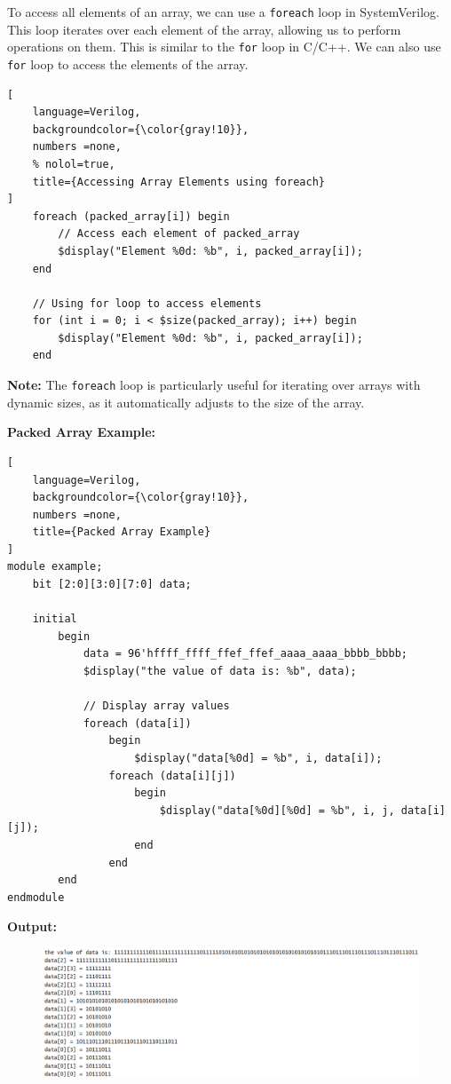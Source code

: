 \documentclass[12pt, a4paper]{article}
\begin{document}
To access all elements of an array, we can use a \texttt{foreach} loop in SystemVerilog. This loop iterates over each element of the array, allowing us to perform operations on them. This is similar to the \texttt{for} loop in C/C++. We can also use \texttt{for} loop to access the elements of the array.
\begin{lstlisting}[
    language=Verilog,
    backgroundcolor={\color{gray!10}},
    numbers =none,
    % nolol=true,
    title={Accessing Array Elements using foreach}
]
    foreach (packed_array[i]) begin
        // Access each element of packed_array
        $display("Element %0d: %b", i, packed_array[i]);
    end

    // Using for loop to access elements
    for (int i = 0; i < $size(packed_array); i++) begin
        $display("Element %0d: %b", i, packed_array[i]);
    end
\end{lstlisting}

\textbf{Note:} The \texttt{foreach} loop is particularly useful for iterating over arrays with dynamic sizes, as it automatically adjusts to the size of the array.

\vspace{0.5em}

\textbf{Packed Array Example:}
\begin{lstlisting}[
    language=Verilog,
    backgroundcolor={\color{gray!10}},
    numbers =none,
    title={Packed Array Example}
]
module example;
    bit [2:0][3:0][7:0] data; 

    initial 
        begin
            data = 96'hffff_ffff_ffef_ffef_aaaa_aaaa_bbbb_bbbb;
            $display("the value of data is: %b", data);
            
            // Display array values
            foreach (data[i]) 
                begin
                    $display("data[%0d] = %b", i, data[i]);
                foreach (data[i][j]) 
                    begin
                        $display("data[%0d][%0d] = %b", i, j, data[i][j]);
                    end
                end
        end
endmodule
\end{lstlisting}

\textbf{Output:}
\vspace{-0.5em}
\begin{figure}[H]
    \centering
    \includegraphics[width=1\textwidth]{Packed_Output.png}
\end{figure}
\end{document}
